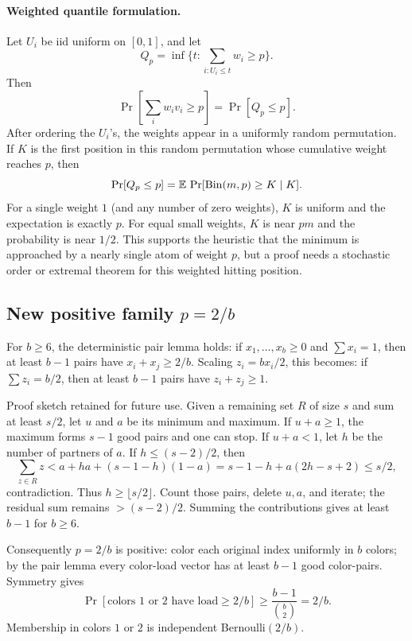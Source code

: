 \documentclass[12pt]{article}
\begin{document}
\paragraph{Weighted quantile formulation.}
Let \(U_i\) be iid uniform on \([0,1]\), and let
\[
 Q_p=\inf\{t:\sum_{i:U_i\le t} w_i\ge p\}.
\]
Then
\[
 \Pr\left[\sum_i w_i v_i\ge p\right]=\Pr[Q_p\le p].
\]
After ordering the \(U_i\)'s, the weights appear in a uniformly random
permutation.  If \(K\) is the first position in this random permutation whose
cumulative weight reaches \(p\), then
\[
 \Pr[Q_p\le p]=\mathbb E\,\Pr[{\rm Bin}(m,p)\ge K\mid K].
\]
For a single weight \(1\) (and any number of zero weights), \(K\) is uniform and
the expectation is exactly \(p\).  For equal small weights, \(K\) is near \(pm\)
and the probability is near \(1/2\).  This supports the heuristic that the
minimum is approached by a nearly single atom of weight \(p\), but a proof needs
a stochastic order or extremal theorem for this weighted hitting position.

\subsection*{New positive family \(p=2/b\)}

For \(b\ge6\), the deterministic pair lemma holds: if \(x_1,\ldots,x_b\ge0\)
and \(\sum x_i=1\), then at least \(b-1\) pairs have
\(x_i+x_j\ge2/b\).  Scaling \(z_i=bx_i/2\), this becomes: if
\(\sum z_i=b/2\), then at least \(b-1\) pairs have \(z_i+z_j\ge1\).

Proof sketch retained for future use.  Given a remaining set \(R\) of size
\(s\) and sum at least \(s/2\), let \(u\) and \(a\) be its minimum and maximum.
If \(u+a\ge1\), the maximum forms \(s-1\) good pairs and one can stop.  If
\(u+a<1\), let \(h\) be the number of partners of \(a\).  If
\(h\le(s-2)/2\), then
\[
 \sum_{z\in R}z
 < a+ha+(s-1-h)(1-a)
 =s-1-h+a(2h-s+2)\le s/2,
\]
contradiction.  Thus \(h\ge\lfloor s/2\rfloor\).  Count those pairs, delete
\(u,a\), and iterate; the residual sum remains \(>(s-2)/2\).  Summing the
contributions gives at least \(b-1\) for \(b\ge6\).

Consequently \(p=2/b\) is positive: color each original index uniformly in
\(b\) colors; by the pair lemma every color-load vector has at least \(b-1\)
good color-pairs.  Symmetry gives
\[
 \Pr[\text{colors }1\text{ or }2\text{ have load}\ge2/b]
 \ge \frac{b-1}{\binom b2}=2/b.
\]
Membership in colors \(1\) or \(2\) is independent Bernoulli\((2/b)\).
\end{document}
